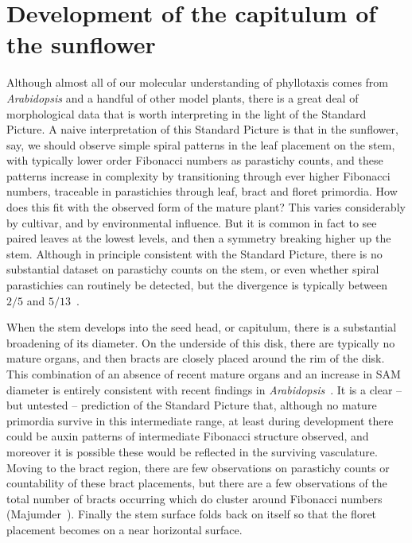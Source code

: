 \section{Development of the capitulum of the sunflower}
Although almost all of our molecular understanding of phyllotaxis comes from \textit{Arabidopsis} and a handful of other model plants, there is a great deal of morphological data that is worth interpreting in the light of the Standard Picture. 
A naive interpretation of this Standard Picture is that in the sunflower, say, we should observe simple spiral patterns in the leaf placement on the stem, with typically lower order Fibonacci numbers as parastichy counts, and these patterns increase in complexity by transitioning through ever higher Fibonacci numbers, traceable in parastichies through leaf, bract and floret primordia. How does this fit with the observed form of the mature plant? This varies considerably by cultivar, and by environmental influence.
But it is common in fact to see paired leaves at the lowest levels, and then a symmetry breaking higher up the stem. Although in principle consistent with the Standard Picture, there is no substantial dataset on parastichy counts on the stem, or even whether spiral parastichies can routinely be detected, but the divergence is typically between $2/5$ and $5/13$~\autocite{churchRelationPhyllotaxisMechanical1904}.  

When the stem develops into the seed head, or capitulum, there is a substantial broadening of its diameter. On the underside of this disk,  there are typically no mature organs, and then bracts are closely placed around the rim of the disk. This combination of an absence of recent mature organs and an increase in SAM diameter is entirely consistent with recent findings in \textit{Arabidopsis}~\cite{shiFeedbackLateralOrgans2018}. It is a clear -- but untested -- prediction of the Standard Picture that, although no mature primordia survive in this intermediate range, at least during development there could be  auxin patterns of intermediate Fibonacci structure observed,  and moreover it is possible these would be reflected in the surviving vasculature. Moving to the bract region,  there are few observations on parastichy counts or countability of these bract placements, but there are a few observations of the total number of bracts occurring which do cluster around Fibonacci numbers (Majumder~\cite{majumderVariationNumberRay1976}). Finally the stem surface folds back on itself so that the floret placement becomes on a near horizontal surface.
	
